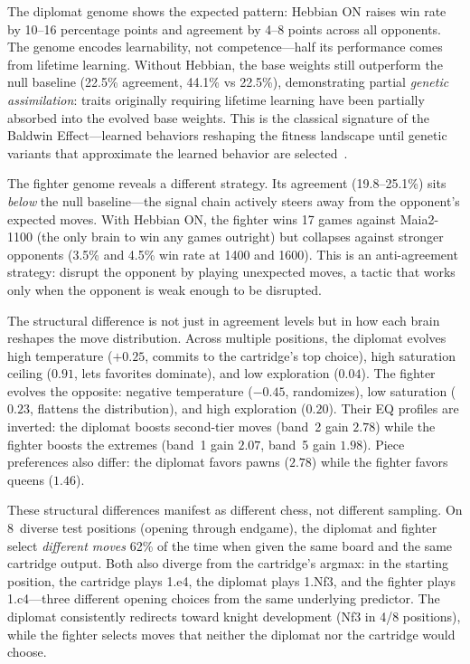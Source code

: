 \documentclass[11pt,a4paper]{article}
\begin{document}
The diplomat genome shows the expected pattern: Hebbian ON raises win rate by 10--16 percentage points and agreement by 4--8 points across all opponents.
The genome encodes learnability, not competence---half its performance comes from lifetime learning.
Without Hebbian, the base weights still outperform the null baseline (22.5\% agreement, 44.1\% vs 22.5\%), demonstrating partial \emph{genetic assimilation}: traits originally requiring lifetime learning have been partially absorbed into the evolved base weights.
This is the classical signature of the Baldwin Effect---learned behaviors reshaping the fitness landscape until genetic variants that approximate the learned behavior are selected~\citep{baldwin1896}.

The fighter genome reveals a different strategy.
Its agreement (19.8--25.1\%) sits \emph{below} the null baseline---the signal chain actively steers away from the opponent's expected moves.
With Hebbian ON, the fighter wins 17 games against Maia2-1100 (the only brain to win any games outright) but collapses against stronger opponents (3.5\% and 4.5\% win rate at 1400 and 1600).
This is an anti-agreement strategy: disrupt the opponent by playing unexpected moves, a tactic that works only when the opponent is weak enough to be disrupted.

The structural difference is not just in agreement levels but in how each brain reshapes the move distribution.
Across multiple positions, the diplomat evolves high temperature ($+0.25$, commits to the cartridge's top choice), high saturation ceiling ($0.91$, lets favorites dominate), and low exploration ($0.04$).
The fighter evolves the opposite: negative temperature ($-0.45$, randomizes), low saturation ($0.23$, flattens the distribution), and high exploration ($0.20$).
Their EQ profiles are inverted: the diplomat boosts second-tier moves (band~2 gain $2.78$) while the fighter boosts the extremes (band~1 gain $2.07$, band~5 gain $1.98$).
Piece preferences also differ: the diplomat favors pawns ($2.78$) while the fighter favors queens ($1.46$).

These structural differences manifest as different chess, not different sampling.
On 8~diverse test positions (opening through endgame), the diplomat and fighter select \emph{different moves} 62\% of the time when given the same board and the same cartridge output.
Both also diverge from the cartridge's argmax: in the starting position, the cartridge plays 1.e4, the diplomat plays 1.Nf3, and the fighter plays 1.c4---three different opening choices from the same underlying predictor.
The diplomat consistently redirects toward knight development (Nf3 in 4/8 positions), while the fighter selects moves that neither the diplomat nor the cartridge would choose.
\end{document}
